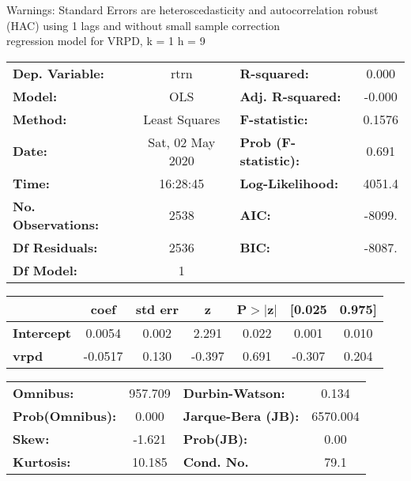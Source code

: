 Warnings: \newline
 [1] Standard Errors are heteroscedasticity and autocorrelation robust (HAC) using 1 lags and without small sample correction\\ 

regression model for VRPD, k = 1 h = 9\begin{center}
\begin{tabular}{lclc}
\toprule
\textbf{Dep. Variable:}    &       rtrn       & \textbf{  R-squared:         } &     0.000   \\
\textbf{Model:}            &       OLS        & \textbf{  Adj. R-squared:    } &    -0.000   \\
\textbf{Method:}           &  Least Squares   & \textbf{  F-statistic:       } &    0.1576   \\
\textbf{Date:}             & Sat, 02 May 2020 & \textbf{  Prob (F-statistic):} &    0.691    \\
\textbf{Time:}             &     16:28:45     & \textbf{  Log-Likelihood:    } &    4051.4   \\
\textbf{No. Observations:} &        2538      & \textbf{  AIC:               } &    -8099.   \\
\textbf{Df Residuals:}     &        2536      & \textbf{  BIC:               } &    -8087.   \\
\textbf{Df Model:}         &           1      & \textbf{                     } &             \\
\bottomrule
\end{tabular}
\begin{tabular}{lcccccc}
                   & \textbf{coef} & \textbf{std err} & \textbf{z} & \textbf{P$> |$z$|$} & \textbf{[0.025} & \textbf{0.975]}  \\
\midrule
\textbf{Intercept} &       0.0054  &        0.002     &     2.291  &         0.022        &        0.001    &        0.010     \\
\textbf{vrpd}      &      -0.0517  &        0.130     &    -0.397  &         0.691        &       -0.307    &        0.204     \\
\bottomrule
\end{tabular}
\begin{tabular}{lclc}
\textbf{Omnibus:}       & 957.709 & \textbf{  Durbin-Watson:     } &    0.134  \\
\textbf{Prob(Omnibus):} &   0.000 & \textbf{  Jarque-Bera (JB):  } & 6570.004  \\
\textbf{Skew:}          &  -1.621 & \textbf{  Prob(JB):          } &     0.00  \\
\textbf{Kurtosis:}      &  10.185 & \textbf{  Cond. No.          } &     79.1  \\
\bottomrule
\end{tabular}
\end{center}

